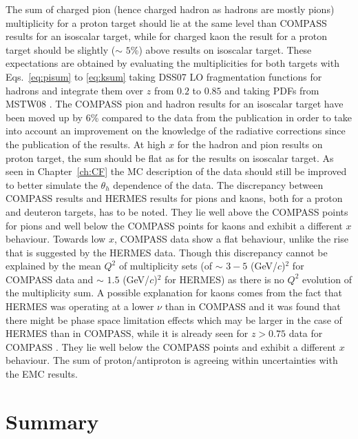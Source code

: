 The sum of charged pion (hence charged hadron as hadrons are mostly pions) multiplicity for a proton target should lie at the same level than COMPASS results for an isoscalar target, while for charged kaon the result for a proton target should be slightly ($\sim$ $5$\%) above results on isoscalar target. These expectations are obtained by evaluating the multiplicities for both targets with Eqs.~\ref{eq:pisum} to \ref{eq:ksum} taking DSS07 \cite{DSS07} LO fragmentation functions for hadrons and integrate them over $z$ from $0.2$ to $0.85$ and taking PDFs from MSTW08 \cite{MSTW08}. The COMPASS pion and hadron results for an isoscalar target have been moved up by $6$\% compared to the data from the publication in order to take into account an improvement on the knowledge of the radiative corrections since the publication of the results. At high $x$ for the hadron and pion results on proton target, the sum should be flat as for the results on isoscalar target. As seen in Chapter~\ref{ch:CF} the MC description of the data should still be improved to better simulate the $\theta_h$ dependence of the data. The discrepancy between COMPASS results and HERMES results for pions and kaons, both for a proton and deuteron targets, has to be noted. They lie well above the COMPASS points for pions and well below the COMPASS points for kaons and exhibit a different $x$ behaviour. Towards low $x$, COMPASS data show a flat behaviour, unlike the rise that is suggested by the HERMES data. Though this discrepancy cannot be explained by the mean $Q^2$ of multiplicity sets (of $\sim$ $3-5$ (GeV/$c$)$^2$ for COMPASS data and $\sim$ $1.5$ (GeV/$c$)$^2$ for HERMES) as there is no $Q^2$ evolution of the multiplicity sum. A possible explanation for kaons comes from the fact that HERMES was operating at a lower $\nu$ than in COMPASS and it was found that there might be phase space limitation effects which may be larger in the case of HERMES than in COMPASS, while it is already seen for $z>0.75$ data for COMPASS \cite{MarcinPubli}. They lie well below the COMPASS points and exhibit a different $x$ behaviour. The sum of proton/antiproton is agreeing within uncertainties with the EMC results.

\section{Summary}

